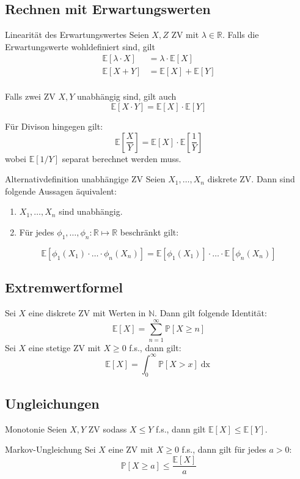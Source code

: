 \documentclass[a4paper,10pt]{article}
\def\R{\mathbb{R}}
\def\P{\mathbb{P}}
\def\E{\mathbb{E}}
\begin{document}
\subsection{Rechnen mit Erwartungswerten}
\begin{subbox}{Linearität des Erwartungswertes}
	Seien \(X,Z\) ZV mit \(\lambda \in \R\). Falls die Erwartungswerte wohldefiniert sind, gilt
	\begin{align*}
		\E[\lambda \cdot X] & = \lambda \cdot \E[X] \\
		\E[X + Y]           & = \E[X] + \E[Y]       \\
	\end{align*}
\end{subbox}
Falls zwei ZV \(X,Y\) unabhängig sind, gilt auch
\[\E[X\cdot Y] = \E[X] \cdot \E[Y]\]

Für Divison hingegen gilt:
\[\E[\frac{X}{Y}] = \E[X] \cdot \E[\frac{1}{Y}]\]
wobei \(\E[1/Y]\) separat berechnet werden muss.

\begin{subbox}{Alternativdefinition unabhängige ZV}
	Seien \(X_1, \ldots, X_n\) diskrete ZV. Dann sind folgende Aussagen äquivalent:
	\begin{enumerate}
		\item \(X_1, \ldots, X_n\) sind unabhängig.
		\item Für jedes \(\phi_1, \ldots, \phi_n: \R \mapsto\R\) beschränkt gilt:
	\end{enumerate}
\[\E[\phi_1(X_1)\cdot\ldots\cdot\phi_n(X_n)] = \E[\phi_1(X_1)] \cdot\ldots\cdot \E[\phi_n(X_n)]\]
\end{subbox}

\subsection{Extremwertformel}
Sei \(X\) eine diskrete ZV mit Werten in \(\mathbb{N}\). Dann gilt folgende Identität:
\[\E[X] = \sum_{n=1}^\infty \P[X\ge n]\]
Sei \(X\) eine stetige ZV mit \(X \ge 0\) f.s., dann gilt:
\[\E[X] = \int_0^\infty \P[X > x] \mathop{dx}\]

\subsection{Ungleichungen}
\begin{subbox}{Monotonie}
	Seien \(X, Y\) ZV sodass \(X \le Y\) f.s., dann gilt \(\E[X] \le \E[Y]\).
\end{subbox}

\begin{mainbox}{Markov-Ungleichung}
	Sei \(X\) eine ZV mit \(X \ge 0\) f.s., dann gilt für jedes \(a > 0\):
	\[\P[X\ge a] \le \frac{\E[X]}{a}\]
\end{mainbox}
\end{document}

